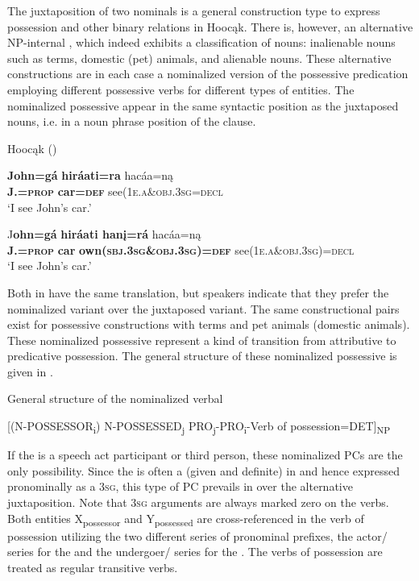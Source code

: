 \documentclass[output=paper]{LSP/langsci}
\begin{document}
The juxtaposition of two nominals is a general construction type to express possession and other binary relations in Hoocąk. There is, however, an alternative NP-internal , which indeed exhibits a classification of nouns: inalienable nouns such as  terms, domestic (pet) animals, and alienable nouns. These alternative constructions are in each case a nominalized version of the possessive predication employing different possessive verbs for different types of  entities. The nominalized possessive  appear in the same syntactic position as the juxtaposed nouns, i.e. in a noun phrase position of the clause. 
 

\ea {}Hoocąk (\citealt[16]{Helmbrecht2003}) \label{seecar}

\ea 
\gll \textbf{John=g\'a} \textbf{hir\'aati=ra}  hac\'aa=n\k{a} \\
\textbf{J.=\textsc{prop}} \textbf{car=\textsc{def}} see(\textsc{1e.a}\&\textsc{obj.3sg}=\textsc{decl} \\
\glt `I see John's car.'  

\ex 
\gll J\textbf{ohn=g\'a} \textbf{hir\'aati han\k{i}=r\'a} hac\'aa=n\k{a}  \\
\textbf{J.=\textsc{prop}} \textbf{car} \textbf{own(\textsc{sbj.3sg}\&\textsc{obj.3sg})=\textsc{def}} see(\textsc{1e.a}\&\textsc{obj.3sg})=\textsc{decl}  \\
\glt `I see John's car.'
\z
\z 

Both  in  have the same translation, but speakers indicate that they prefer the nominalized variant over the juxtaposed variant. The same constructional pairs exist for possessive constructions with  terms and pet animals (domestic animals). These nominalized possessive  represent a kind of transition from attributive to predicative possession. The general structure of these nominalized possessive  is given in .

\ea General structure of the nominalized verbal  \label{generalstructure}

[(N-POSSESSOR\textsubscript{i})  N-POSSESSED\textsubscript{j}    PRO\textsubscript{j}-PRO\textsubscript{i}-Verb of possession=DET]\textsubscript{NP}
\z

If the  is a speech act participant or third person, these nominalized PCs are the only possibility. Since the  is often a  (given and definite) in  and hence expressed pronominally as a \textsc{3sg}, this type of PC prevails in  over the alternative juxtaposition. Note that \textsc{3sg} arguments are always marked zero on the verbs. Both entities X\textsubscript{possessor} and Y\textsubscript{possessed} are cross-referenced in the verb of possession utilizing the two different series of pronominal prefixes, the actor/ series for the  and the undergoer/ series for the . The verbs of possession are treated as regular transitive verbs.
\end{document}
